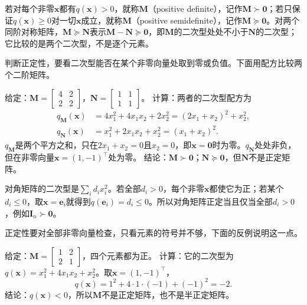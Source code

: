 若对每个非零$\bm x$都有$q(\bm x)>0$，就称$\bm M$（positive definite），记作$\bm M\succ\bm0$；若只保证$q(\bm x)\geq0$对一切$\bm x$成立，就称$\bm M$（positive semidefinite），记作$\bm M\succeq\bm0$。对两个同阶对称矩阵，$\bm M\succeq\bm N$表示$\bm M-\bm N\succeq\bm0$，即$\bm M$的二次型处处不小于$\bm N$的二次型；它比较的是两个二次型，不是逐个元素。

判断正定性，要看二次型能否在某个非零向量处取到零或负值。下面用配方比较两个二阶矩阵。
\begin{example}[用配方区分正定与半正定]
\label{ex:ls-pd-psd-completing-square}
给定：$\bm M=\left[\begin{smallmatrix}4&2\\2&2\end{smallmatrix}\right]$，$\bm N=\left[\begin{smallmatrix}1&1\\1&1\end{smallmatrix}\right]$。
计算：两者的二次型配方为
\[
 \begin{aligned}
 q_{\bm M}(\bm x)&=4x_1^2+4x_1x_2+2x_2^2=(2x_1+x_2)^2+x_2^2,\\
 q_{\bm N}(\bm x)&=x_1^2+2x_1x_2+x_2^2=(x_1+x_2)^2.
 \end{aligned}
\]
$q_{\bm M}$是两个平方之和，只在$2x_1+x_2=0$且$x_2=0$，即$\bm x=\bm0$时为零。$q_{\bm N}$处处非负，但在非零向量$\bm x=(1,-1)^\top$处为零。
结论：$\bm M\succ\bm0$；$\bm N\succeq\bm0$，但$\bm N$不是正定矩阵。
\end{example}

对角矩阵的二次型是$\sum_id_ix_i^2$。若全部$d_i>0$，每个非零$\bm x$都使它为正；若某个$d_i\leq0$，取$\bm x=\bm e_i$就得到$q(\bm e_i)=d_i\leq0$。所以对角矩阵正定当且仅当全部$d_i>0$，例如$\bm I_n\succ\bm0$。

正定性要对全部非零向量检查，只看元素的符号并不够，下面的反例说明这一点。
\begin{example}[反例：元素全为正的对称矩阵未必正定]
\label{ex:ls-positive-entries-not-pd}
给定：$\bm M=\left[\begin{smallmatrix}1&2\\2&1\end{smallmatrix}\right]$，四个元素都为正。
计算：它的二次型为$q(\bm x)=x_1^2+4x_1x_2+x_2^2$。取$\bm x=(1,-1)^\top$，
\[
 q(\bm x)=1^2+4\cdot1\cdot(-1)+(-1)^2=-2.
\]
结论：$q(\bm x)<0$，所以$\bm M$不是正定矩阵，也不是半正定矩阵。
\end{example}


